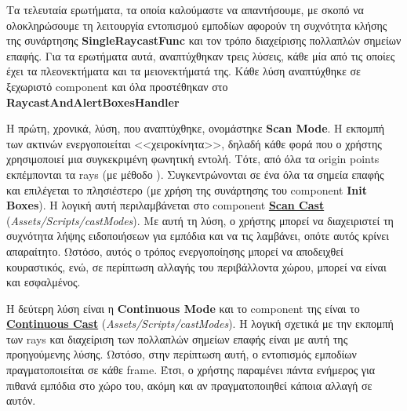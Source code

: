 Tα τελευταία ερωτήματα, τα οποία καλούμαστε να απαντήσουμε, με σκοπό να ολοκληρώσουμε τη λειτουργία εντοπισμού εμποδίων αφορούν τη συχνότητα κλήσης της συνάρτησης \textbf{SingleRaycastFunc} και τον τρόπο διαχείρισης πολλαπλών σημείων επαφής. Για τα ερωτήματα αυτά, αναπτύχθηκαν τρεις λύσεις, κάθε μία από τις οποίες έχει τα πλεονεκτήματα και τα μειονεκτήματά της. Κάθε λύση αναπτύχθηκε σε ξεχωριστό component και όλα προστέθηκαν στο  \textbf{RaycastAndAlertBoxesHandler}

Η πρώτη, χρονικά, λύση, που αναπτύχθηκε, ονομάστηκε \textbf{Scan Mode}. Η εκπομπή των ακτινών ενεργοποιείται <<χειροκίνητα>>, δηλαδή κάθε φορά που ο χρήστης χρησιμοποιεί μια συγκεκριμένη φωνητική εντολή. Τότε, από όλα τα origin points εκπέμπονται τα rays (με μέθοδο ). Συγκεντρώνονται σε ένα  όλα τα σημεία επαφής και επιλέγεται το πλησιέστερο (με χρήση της συνάρτησης  του component \textbf{Init Boxes}). Η λογική αυτή περιλαμβάνεται στο component \hyperref[lst:scanCast]{\textbf{Scan Cast}} (\textit{Assets/Scripts/castModes}). Με αυτή τη λύση, ο χρήστης μπορεί να διαχειριστεί τη συχνότητα λήψης ειδοποιήσεων για εμπόδια και να τις λαμβάνει, οπότε αυτός κρίνει απαραίτητο. Ωστόσο, αυτός ο τρόπος ενεργοποίησης μπορεί να αποδειχθεί κουραστικός, ενώ, σε περίπτωση αλλαγής του περιβάλλοντα χώρου, μπορεί να είναι και εσφαλμένος.

Η δεύτερη λύση είναι η \textbf{Continuous Mode} και το component της είναι το \hyperref[lst:continuousCast]{\textbf{Continuous Cast}} (\textit{Assets/Scripts/castModes}). Η λογική σχετικά με την εκπομπή των rays και διαχείριση των πολλαπλών σημείων επαφής είναι με αυτή της προηγούμενης λύσης. Ωστόσο, στην περίπτωση αυτή, ο εντοπισμός εμποδίων πραγματοποιείται σε κάθε frame. Έτσι, ο χρήστης παραμένει πάντα ενήμερος για πιθανά εμπόδια στο χώρο του, ακόμη και αν πραγματοποιηθεί κάποια αλλαγή σε αυτόν.

